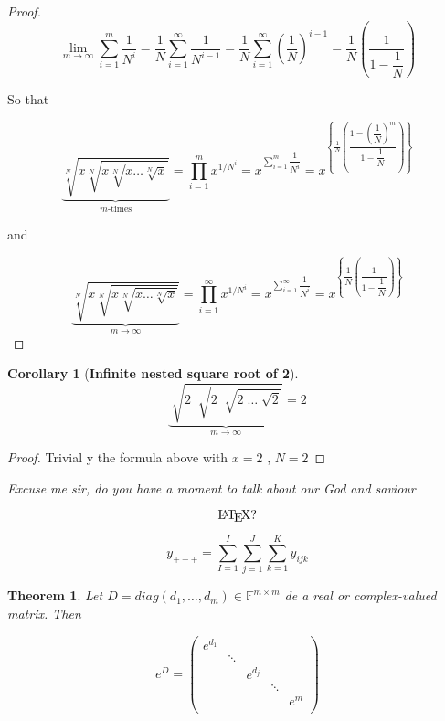 \documentclass[12pt a]{article}
\newtheorem{theorem}{Theorem}
\theoremstyle{definition}
\newtheorem{corollary}{Corollary}
\theoremstyle{definition}
\theoremstyle{definition}
\begin{document}
{\begin{proof}
$$
\underset{m \rightarrow \infty}{\lim} \sum_{i=1}^{m} \dfrac{1}{N^{i}}
= 
\dfrac{1}{N} \sum_{i=1}^{\infty} \dfrac{1}{N^{i-1}}
= 
\dfrac{1}{N} \sum_{i=1}^{\infty} \left( \dfrac{1}{N} \right)^{i-1}
= 
\dfrac{1}{N} \left(\dfrac{1}{1-\dfrac{1}{N}}\right)
$$

So that 

\begin{equation}
\underset{m\text{-times}}{\underbrace{\displaystyle \sqrt[N]{x \sqrt[N]{x \sqrt[N]{x \dots \sqrt[N]{x}} }}
}}
= \prod_{i=1}^{m}x^{1/N^{i}} 
= x^{\displaystyle \sum_{i=1}^{m} \dfrac{1}{N^{i}} }
=
x^{ \left\{ \displaystyle \frac{1}{N}\left( \dfrac{1-\left(\dfrac{1}{N}\right)^{m}}{1 - \dfrac{1}{N}} \right) \right\} }
\end{equation}

and  

\begin{equation}
\underset{m \rightarrow \infty}{\underbrace{\displaystyle \sqrt[N]{x \sqrt[N]{x \sqrt[N]{x \dots \sqrt[N]{x}} }}
}}
= \prod_{i=1}^{\infty}x^{1/N^{i}} 
= x^{\displaystyle \sum_{i=1}^{\infty} \dfrac{1}{N^{i}} }
=
x^{ \left\{ \displaystyle  \dfrac{1}{N} \left(\dfrac{1}{1-\dfrac{1}{N}}\right)  \right\} } 
\end{equation}

\end{proof}


\begin{corollary}[\textbf{Infinite nested square root of 2}] 
$$
\underset{m \rightarrow \infty}{\underbrace{\displaystyle \sqrt[]{2 \; \sqrt[]{2 \; \sqrt[]{2 \; \dots \sqrt[]{2}} }}
}}
= 2 
$$
\end{corollary}

\begin{proof}
Trivial y the formula above with $x=2$ , $N=2$
\end{proof}



\textit{Excuse me sir, do you have a moment to talk about our God and saviour }

$$\text{\LaTeX} ?$$ 


$$
y_{+++} = \sum_{I=1}^I \sum_{j=1}^J \sum_{k=1}^K y_{ijk}
$$

\newpage

\begin{theorem}
Let $D = diag(d_1,\dots,d_m) \in \mathbb{F}^{m \times m}$ de a real or complex-valued matrix. Then 

$$
e^{D} = 
\begin{pmatrix}
e^{d_1}    &      &     &    &    \\ 
  & \ddots &      &     &   \\ 
  &  & e^{d_j}    &     &     \\ 
  &        &      & \ddots  &     \\ 
  &  &      &     & e^{m}  \\ 
\end{pmatrix}
$$
\end{theorem}


}
\end{document}

